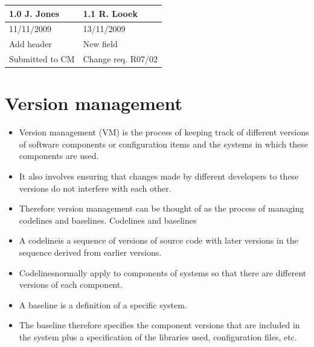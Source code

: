 \newpage
\begin{table}[h!]
\centering
\begin{tabular}{ |p{4cm}|p{4cm}|  }
\hline
1.0	J. Jones & 1.1	R. Looek\\
\hline
11/11/2009 & 13/11/2009\\
\hline
Add header & New field\\
\hline
Submitted to CM & Change req. R07/02\\
\hline
\end{tabular}

\label{table:T6_3}
\end{table}

\section{Version management}
\begin{itemize}
\item Version management (VM) is the process of keeping track of different versions of software components or configuration items and the systems in which these components are used.

\item It also involves ensuring that changes made by different developers to these versions do not interfere with each other.

\item Therefore version management can be thought of as the process of managing codelines and baselines.
Codelines and baselines
\item A codelineis a sequence of versions of source code with later versions in the sequence derived from earlier versions.

\item Codelinesnormally apply to components of systems so that there are different versions of each component.

\item A baseline is a definition of a specific system.

\item The baseline therefore specifies the component versions that are included in the system plus a specification of the libraries used, configuration files, etc.


\end{itemize}



